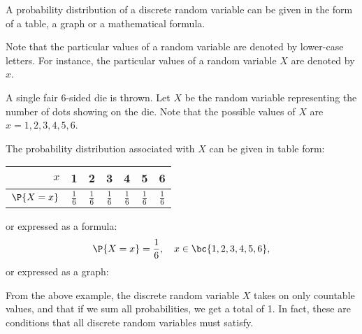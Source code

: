 A probability distribution of a discrete random variable can be given in the form of a table, a graph or a mathematical formula.

Note that the particular values of a random variable are denoted by lower-case letters. For instance, the particular values of a random variable $X$ are denoted by $x$.

\begin{example}
    A single fair 6-sided die is thrown. Let $X$ be the random variable representing the number of dots showing on the die. Note that the possible values of $X$ are $x = 1, 2, 3, 4, 5, 6$.

    The probability distribution associated with $X$ can be given in table form:
    \begin{center}
        \begin{tabular}{|r|c|c|c|c|c|c|}
            \hline
            $x$ & 1 & 2 & 3 & 4 & 5 & 6 \\ \hline
            $\P{X = x}$ & $\frac16$ & $\frac16$ & $\frac16$ & $\frac16$ & $\frac16$ & $\frac16$ \\ \hline
        \end{tabular}
    \end{center}
    or expressed as a formula: \[\P{X = x} = \frac16, \quad x \in \bc{1, 2, 3, 4, 5, 6},\] or expressed as a graph:
    \begin{center}
    \end{center}
\end{example}

From the above example, the discrete random variable $X$ takes on only countable values, and that if we sum all probabilities, we get a total of 1. In fact, these are conditions that all discrete random variables must satisfy.

